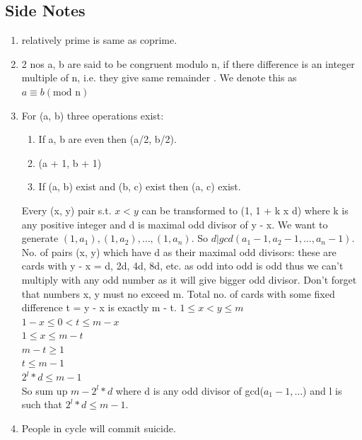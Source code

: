 \documentclass[8pt, a4paper, oneside, twocolumn]{extarticle}
\begin{document}
\subsection{Side Notes}
\begin{enumerate}
    \item relatively prime is same as coprime.
    \item 2 nos a, b are said to be congruent modulo n, if there difference is an integer multiple of n, i.e. they give same remainder . We denote this as $a \equiv b (\text{mod n})$
    \item For (a, b) three operations exist:
    \begin{enumerate}
        \item If a, b are even then (a/2, b/2).
        \item (a + 1, b + 1)
        \item If (a, b) exist and (b, c) exist then (a, c) exist.
    \end{enumerate}
    Every (x, y) pair s.t. $x < y$ can be transformed to (1, 1 + k x d) where k is any positive integer and d is maximal odd divisor of y - x. We want to generate $(1, a_1), (1, a_2), \dots, (1, a_n)$. So $d | gcd(a_1 - 1, a_2 - 1, \dots, a_n - 1)$. No. of pairs (x, y) which have d as their maximal odd divisors: these are cards with y - x = d, 2d, 4d, 8d, etc. as odd into odd is odd thus we can't multiply with any odd number as it will give bigger odd divisor. Don't forget that numbers x, y must no exceed m. Total no. of cards with some fixed difference t = y - x is exactly m - t. $1 \leq x < y \leq m$\\
    $1 - x \leq 0 < t \leq m - x$\\
    $1 \leq x \leq m - t$\\
    $m - t \geq 1$\\
    $t \leq m - 1$
    \\$2^l * d \leq m - 1$\\
    So sum up $m - 2^l * d$ where d is any odd divisor of gcd($a_1 - 1, \dots$) and l is such that $2^l * d \leq m - 1$.
    \item People in cycle will commit suicide.
    

\end{enumerate}
\end{document}
